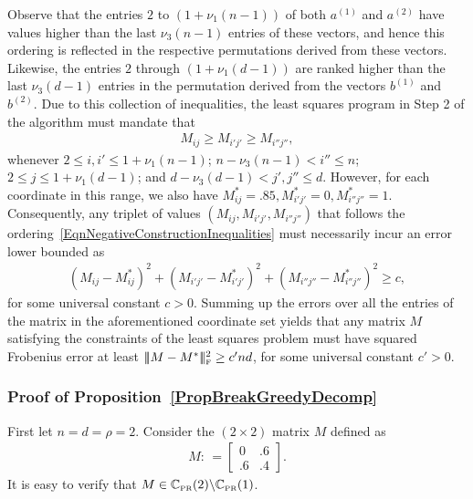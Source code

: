 \documentclass[11pt, hidelinks]{article} %
\newcommand{\matsnorm}[2]{|\!|\!| #1 | \! | \!|_{{#2}}}
\newcommand{\frobnorm}[1]{\ensuremath{\matsnorm{#1}{\mbox{\tiny{F}}}}}
\newcommand{\defn}{\ensuremath{:\,=}}
\newcommand{\numrows}{n}
\newcommand{\numcols}{d}
\newcommand{\plaincon}{c}
\newcommand{\wtmatrix}{M}
\newcommand{\wt}{\wtmatrix}
\newcommand{\wtstar}{\wtmatrix^*}
\newcommand{\matrixset}{\mathbb{C}}
\newcommand{\permset}{\matrixset_{\mbox{\tiny PR}}}
\newcommand{\permrank}{\rho}
\newcommand{\leftvec}{a}
\newcommand{\rightvec}{b}
\newcommand{\subveclength}{\nu}
\begin{document}
Observe that the entries $2$ to $(1+\subveclength_1
(\numrows-1))$ of both $\leftvec^{(1)}$ and $\leftvec^{(2)}$ have values higher than
the last $\subveclength_3 (\numrows-1)$ entries of these vectors, and hence
this ordering is reflected in the respective permutations
derived from these vectors. Likewise, the entries $2$ through
$(1+\subveclength_1 (\numcols-1))$ are ranked higher than the last
$\subveclength_3 (\numcols-1)$ entries in the permutation derived from
the vectors $\rightvec^{(1)}$ and $\rightvec^{(2)}$. Due to this collection of
inequalities, the least squares program in Step 2 of the algorithm
must mandate that
\begin{align}
\label{EqnNegativeConstructionInequalities}
\wtmatrix_{ij} \geq \wtmatrix_{i'j'} \geq \wtmatrix_{i''j''},
\end{align}
whenever $2 \leq i,i' \leq 1 + \subveclength_1(\numrows-1)$; $\numrows
- \subveclength_3(\numrows-1) < i'' \leq \numrows$; $2 \leq j \leq
1+\subveclength_1 (\numcols - 1)$; and $ \numcols -
\subveclength_3(\numcols-1) < j', j'' \leq \numcols$.  However, for
each coordinate in this range, we also have $\wtstar_{ij} = .85,
\wtstar_{i'j'} = 0, \wtstar_{i''j''} = 1$. Consequently, any triplet
of values $(\wtmatrix_{ij}, \wtmatrix_{i'j'}, \wtmatrix_{i''j''})$
that follows the ordering~\eqref{EqnNegativeConstructionInequalities}
must necessarily incur an error lower bounded as
\begin{align*}
(\wt_{ij} - \wtstar_{ij})^2 + (\wt_{i'j'} - \wtstar_{i'j'})^2 +
  (\wt_{i''j''} - \wtstar_{i''j''})^2 \geq \plaincon,
\end{align*}
for some universal constant $\plaincon > 0$. Summing up the errors
over all the entries of the matrix in the aforementioned coordinate
set yields that any matrix $\wt$ satisfying the constraints of the
least squares problem must have squared Frobenius error at least
$\frobnorm{\wtmatrix - \wtstar}^2 \geq \plaincon' \numrows \numcols$,
for some universal constant $\plaincon' > 0$.




\subsubsection{Proof of Proposition~\ref{PropBreakGreedyDecomp}}

First let $\numrows = \numcols = \permrank = 2$. Consider the $(2
\times 2)$ matrix $\wt$ defined as
\begin{align*}
\wt \defn 
\begin{bmatrix}
0 & .6 \\ .6 & .4
\end{bmatrix}.
\end{align*}
It is easy to verify that $\wt \in \permset(2) \backslash
\permset(1)$.
\end{document}
